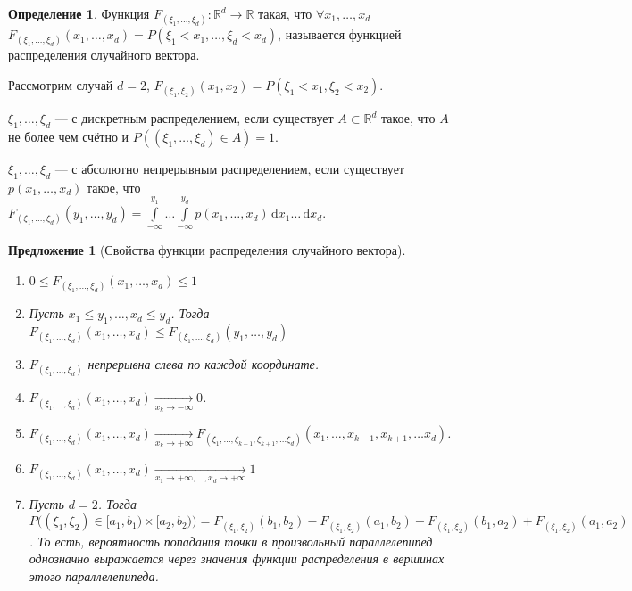 \documentclass[11pt,openany,a4paper]{scrartcl}
\theoremstyle{plain}
\newtheorem{proposition}[theorem]{Предложение}
\theoremstyle{definition}
\newtheorem{definition}[theorem]{Определение}
\newcommand\mb{\mathbb}
\newcommand\real{\mb R}
\newcommand{\underto}[1]{\xrightarrow[#1]{}}
\newcommand{\dif}{\, \mathrm d}
\begin{document}
\begin{definition}
    Функция $F_{(\xi_1, \ldots, \xi_d)}: \real^d \to \real$ такая, что
    $\forall x_1, \ldots, x_d$ $F_{(\xi_1, \ldots, \xi_d)}(x_1, \ldots, x_d) =
    P(\xi_1 < x_1, \ldots, \xi_d < x_d)$, называется функцией распределения
    случайного вектора.
\end{definition}

Рассмотрим случай $d = 2$, $F_{(\xi_1, \xi_2)} (x_1, x_2) =
P(\xi_1 < x_1, \xi_2 < x_2)$.

$\xi_1, \ldots, \xi_d$ — с дискретным распределением, если существует $A \subset 
\real^d$ такое, что $A$ не более чем счётно и
$P((\xi_1, \ldots, \xi_d) \in A) = 1$.

$\xi_1, \ldots, \xi_d$ — с абсолютно непрерывным распределением, если существует
$p(x_1, \ldots, x_d)$ такое, что $F_{(\xi_1, \ldots, \xi_d)}(y_1, \ldots, y_d) =
\int\limits_{-\infty}^{y_1} \ldots \int\limits_{-\infty}^{y_d}
p(x_1, \ldots, x_d) \dif x_1 \ldots \dif x_d$.

\begin{proposition}[Свойства функции распределения случайного вектора]
\mbox{}
    \begin{enumerate}
        \item  $0 \leqslant F_{(\xi_1, \ldots, \xi_d)}(x_1, \ldots, x_d)
        \leqslant 1$
        \item Пусть $x_1 \leqslant y_1, \ldots, x_d \leqslant y_d$.
        Тогда $F_{(\xi_1, \ldots, \xi_d)}(x_1, \ldots, x_d) \leqslant
        F_{(\xi_1, \ldots, \xi_d)}(y_1, \ldots, y_d)$
        \item $F_{(\xi_1, \ldots, \xi_d)}$ непрерывна слева по каждой координате.
        \item $F_{(\xi_1, \ldots, \xi_d)}(x_1, \ldots, x_d)
        \underto{x_k \to -\infty} 0$.
        \item $F_{(\xi_1, \ldots, \xi_d)}(x_1, \ldots, x_d)
        \underto{x_k \to +\infty}
        F_{(\xi_1, \ldots, \xi_{k-1}, \xi_{k+1}, \ldots \xi_d)}
        (x_1, \ldots, x_{k-1}, x_{k+1}, \ldots x_d)$.
        \item $F_{(\xi_1, \ldots, \xi_d)}(x_1, \ldots, x_d)
        \underto{x_1 \to +\infty, \ldots, x_d \to +\infty} 1$
        \item Пусть $d = 2$. Тогда
        $P\big((\xi_1, \xi_2) \in [a_1, b_1) \times [a_2, b_2)\big) =
        F_{(\xi_1, \xi_2)}(b_1, b_2) - F_{(\xi_1, \xi_2)}(a_1, b_2) -
        F_{(\xi_1, \xi_2)}(b_1, a_2) + F_{(\xi_1, \xi_2)}(a_1, a_2)$. То есть, 
        вероятность попадания точки в произвольный параллелепипед
        однозначно выражается 
        через значения функции распределения в вершинах этого параллелепипеда.
    \end{enumerate}
\end{proposition}
\end{document}
